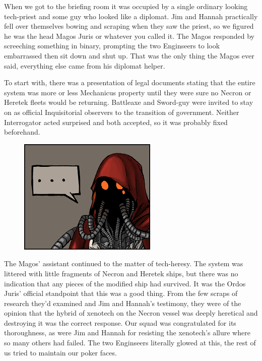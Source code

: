 When we got to the briefing room it was occupied by a single ordinary looking tech-priest and some guy who looked like a diplomat. 
Jim and Hannah practically fell over themselves bowing and scraping when they saw the priest, so we figured he was the head Magos Juris or whatever you called it. 
The Magos responded by screeching something in binary, prompting the two Enginseers to look embarrassed then sit down and shut up. 
That was the only thing the Magos ever said, everything else came from his diplomat helper.

To start with, there was a presentation of legal documents stating that the entire system was more or less Mechanicus property until they were sure no Necron or Heretek fleets would be returning. 
Battleaxe and Sword-guy were invited to stay on as official Inquisitorial observers to the transition of government. 
Neither Interrogator acted surprised and both accepted, so it was probably fixed beforehand.

\begin{figure}
	\begin{center}
		\includegraphics[width=\figwidth]{pics/11/100.png}
	\end{center}
\end{figure}
The Magos' assistant continued to the matter of tech-heresy. 
The system was littered with little fragments of Necron and Heretek ships, but there was no indication that any pieces of the modified ship had survived. 
It was the Ordos Juris' official standpoint that this was a good thing. 
From the few scraps of research they'd examined and Jim and Hannah's testimony, they were of the opinion that the hybrid of xenotech on the Necron vessel was deeply heretical and destroying it was the correct response. 
Our squad was congratulated for its thoroughness, as were Jim and Hannah for resisting the xenotech's allure where so many others had failed. 
The two Enginseers literally glowed at this, the rest of us tried to maintain our poker faces.

